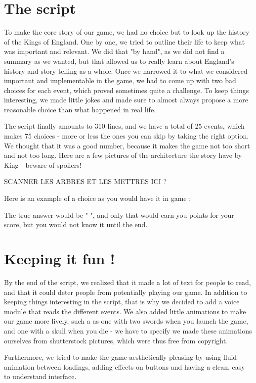 \documentclass{scrreprt}
\begin{document}
\section{The script}

To make the core story of our game, we had no choice but to look up the history of the Kings of England. One by one, we tried to outline their life to keep what was important and relevant. We did that "by hand", as we did not find a summary as we wanted, but that allowed us to really learn about England's history and story-telling as a whole. Once we narrowed it to what we considered important and implementable in the game, we had to come up with two bad choices for each event, which proved sometimes quite a challenge. To keep things interesting, we made little jokes and made sure to almost always propose a more reasonable choice than what happened in real life.

The script finally amounts to 310 lines, and we have a total of 25 events, which makes 75 choices - more or less the ones you can skip by taking the right option. We thought that it was a good number, because it makes the game not too short and not too long. Here are a few pictures of the architecture the story have by King - beware of spoilers!

SCANNER LES ARBRES ET LES METTRES ICI ?

Here is an example of a choice as you would have it in game :




The true answer would be " ", and only that would earn you points for your score, but you would not know it until the end.

\section{Keeping it fun !}

By the end of the script, we realized that it made a lot of text for people to read, and that it could deter people from potentially playing our game. In addition to keeping things interesting in the script, that is why we decided to add a voice module that reads the different events. We also added little animations to make our game more lively, such a as one with two swords when you launch the game, and one with a skull when you die - we have to specify we made these animations ourselves from shutterstock pictures, which were thus free from copyright.

Furthermore, we tried to make the game aesthetically pleasing by using fluid animation between loadings, adding effects on buttons and having a clean, easy to understand interface.
\end{document}
